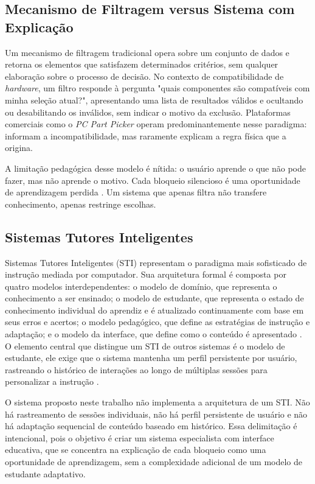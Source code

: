 \subsection{Mecanismo de Filtragem versus Sistema com Explicação}
Um mecanismo de filtragem tradicional opera sobre um conjunto de dados e retorna os elementos que
satisfazem determinados critérios, sem qualquer elaboração sobre o processo de decisão. No contexto de compatibilidade de
\textit{hardware}, um filtro responde à pergunta "quais componentes são compatíveis com minha seleção atual?", apresentando
uma lista de resultados válidos e ocultando ou desabilitando os inválidos, sem indicar o motivo da exclusão. Plataformas comerciais
como o \textit{PC Part Picker} operam predominantemente nesse paradigma: informam a incompatibilidade, mas raramente
explicam a regra física que a origina.

A limitação pedagógica desse modelo é nítida: o usuário aprende o que não pode fazer, mas não aprende o motivo.
Cada bloqueio silencioso é uma oportunidade de aprendizagem perdida \cite{Clancey1983}. Um sistema que apenas
filtra não transfere conhecimento, apenas restringe escolhas.

\subsection{Sistemas Tutores Inteligentes}
Sistemas Tutores Inteligentes (STI) representam o paradigma mais sofisticado de instrução mediada por computador.
Sua arquitetura formal é composta por quatro modelos interdependentes: o modelo de domínio, que representa o
conhecimento a ser ensinado; o modelo de estudante, que representa o estado de conhecimento individual do aprendiz e é
atualizado continuamente com base em seus erros e acertos; o modelo pedagógico, que define as estratégias de instrução e adaptação;
e o modelo da interface, que define como o conteúdo é apresentado \cite{Woolf2008}. O elemento central que distingue
um STI de outros sistemas é o modelo de estudante, ele exige que o sistema mantenha um perfil persistente por usuário, rastreando o histórico
de interações ao longo de múltiplas sessões para personalizar a instrução \cite{Anderson1995}.

O sistema proposto neste trabalho não implementa a arquitetura de um STI. Não há rastreamento de sessões individuais,
não há perfil persistente de usuário e não há adaptação sequencial de conteúdo baseado em histórico. Essa delimitação
é intencional, pois o objetivo é criar um sistema especialista com interface educativa, que se concentra na explicação
de cada bloqueio como uma oportunidade de aprendizagem, sem a complexidade adicional de um modelo de estudante adaptativo.

